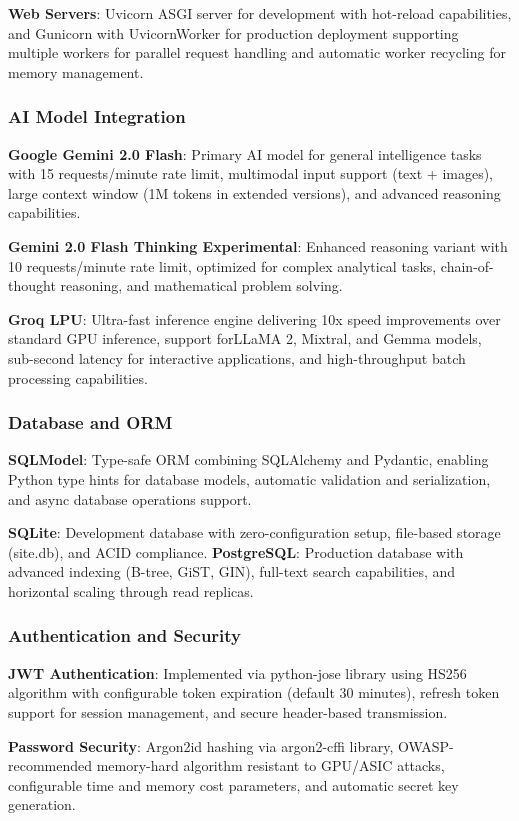 \documentclass[conference]{IEEEtran}
\begin{document}
\textbf{Web Servers}: Uvicorn ASGI server for development with hot-reload capabilities, and Gunicorn with UvicornWorker for production deployment supporting multiple workers for parallel request handling and automatic worker recycling for memory management.

\subsubsection{AI Model Integration}
\textbf{Google Gemini 2.0 Flash}: Primary AI model for general intelligence tasks with 15 requests/minute rate limit, multimodal input support (text + images), large context window (1M tokens in extended versions), and advanced reasoning capabilities.

\textbf{Gemini 2.0 Flash Thinking Experimental}: Enhanced reasoning variant with 10 requests/minute rate limit, optimized for complex analytical tasks, chain-of-thought reasoning, and mathematical problem solving.

\textbf{Groq LPU}: Ultra-fast inference engine delivering 10x speed improvements over standard GPU inference, support forLLaMA 2, Mixtral, and Gemma models, sub-second latency for interactive applications, and high-throughput batch processing capabilities.

\subsubsection{Database and ORM}
\textbf{SQLModel}: Type-safe ORM combining SQLAlchemy and Pydantic, enabling Python type hints for database models, automatic validation and serialization, and async database operations support.

\textbf{SQLite}: Development database with zero-configuration setup, file-based storage (site.db), and ACID compliance. \textbf{PostgreSQL}: Production database with advanced indexing (B-tree, GiST, GIN), full-text search capabilities, and horizontal scaling through read replicas.

\subsubsection{Authentication and Security}
\textbf{JWT Authentication}: Implemented via python-jose library using HS256 algorithm with configurable token expiration (default 30 minutes), refresh token support for session management, and secure header-based transmission.

\textbf{Password Security}: Argon2id hashing via argon2-cffi library, OWASP-recommended memory-hard algorithm resistant to GPU/ASIC attacks, configurable time and memory cost parameters, and automatic secret key generation.
\end{document}
